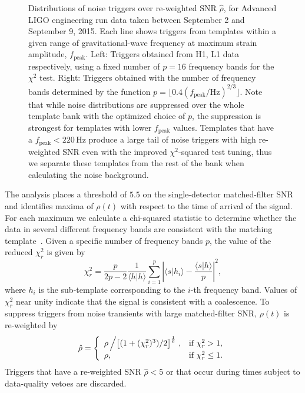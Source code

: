 \begin{figure}[t]
{ }
\caption{\label{fig:chisq_and_template_bins}
Distributions of noise triggers over re-weighted SNR $\hat{\rho}$, for
Advanced LIGO engineering run data taken between September 2 and September 9,
2015.  Each line shows triggers from templates within a given range of
gravitational-wave frequency at maximum strain amplitude, $f_\text{peak}$.
Left: Triggers obtained from H1, L1 data respectively, using a fixed number of
$p=16$ frequency bands for the $\chi^2$ test.  Right: Triggers obtained with
the number of frequency bands determined by the function $p=\lfloor 0.4
(f_\mathrm{peak}/\mathrm{Hz})^{2/3} \rfloor$.  Note that while noise
distributions are suppressed over the whole template bank with the optimized
choice of $p$, the suppression is strongest for templates with lower
$f_\mathrm{peak}$ values. Templates that have a $f_\text{peak} < 220\,$Hz
produce a large tail of noise triggers with high re-weighted SNR even with the
improved $\chi^2$-squared test tuning, thus we separate these templates from
the rest of the bank when calculating the noise background.
}
\end{figure}

The analysis places a threshold of $5.5$ on the single-detector matched-filter
SNR and identifies maxima of $\rho(t)$  with respect to the time of arrival of
the signal. For each maximum we calculate a chi-squared statistic to determine
whether the data in several different frequency bands are consistent with the
matching template~\cite{Allen:2004gu}. Given a specific number of frequency
bands $p$, the value of the reduced $\chi_r^2$ is given by
\begin{equation}
\chi_r^2 = \frac{p}{2p-2} \frac{1}{\langle h | h \rangle} \sum_{i=1}^p  \left|\langle s | h_i\rangle - \frac{\langle s | h\rangle}{p}\right|^2,
\label{eqn:pycbc_chisq}
\end{equation}
where $h_i$ is the sub-template corresponding to the $i$-th
frequency band.  Values of $\chi_r^2$ near unity indicate that the signal is
consistent with a coalescence. To suppress triggers from noise transients with
large matched-filter SNR, $\rho(t)$ is re-weighted
by~\cite{Colaboration:2011np,Babak:2012zx}
\begin{equation}
\hat{\rho} = \left\{\begin{array}{lr}
\rho\left/\left[(1+(\chi^2_r)^3)/2\right]^\frac{1}{6}\right., & \text{if } \chi_r^2 > 1, \\
\rho, & \text{if } \chi_r^2 \le 1.
\end{array}\right.
\end{equation}
Triggers that have a re-weighted SNR $\hat{\rho} < 5$ or that occur during
times subject to data-quality vetoes are discarded.

